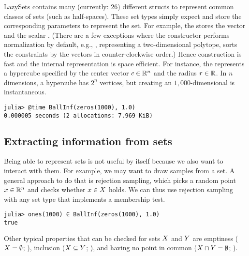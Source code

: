 \smallskip

LazySets contains many (currently: $26$) different structs to represent common classes of sets (such as half-spaces).
These set types simply expect and store the corresponding parameters to represent the set.
For example, the  stores the vector  and the scalar .
(There are a few exceptions where the constructor performs normalization by default, e.g., , representing a two-dimensional polytope, sorts the constraints by the vectors  in counter-clockwise order.)
Hence construction is fast and the internal representation is space efficient.
For instance, the  represents a hypercube specified by the center vector $c \in \mathbb{R}^n$ and the radius $r \in \mathbb{R}$.
In $n$ dimensions, a hypercube has $2^n$ vertices, but creating an $1{,}000$-dimensional  is instantaneous.

\begin{minipage}{\linewidth}
\begin{lstlisting}
julia> @time BallInf(zeros(1000), 1.0)
0.000005 seconds (2 allocations: 7.969 KiB)
\end{lstlisting}
\end{minipage}


\subsection{Extracting information from sets}

Being able to represent sets is not useful by itself because we also want to interact with them.
For example, we may want to draw samples from a set.
A general approach to do that is rejection sampling, which picks a random point $x \in \mathbb{R}^n$ and checks whether $x \in X$ holds.
We can thus use rejection sampling with any set type that implements a membership test.

\begin{minipage}{\linewidth}
\begin{lstlisting}
julia> ones(1000) ∈ BallInf(zeros(1000), 1.0)
true
\end{lstlisting}
\end{minipage}

Other typical properties that can be checked for sets $X$ and $Y$ are emptiness ($X = \emptyset$; ), inclusion ($X \subseteq Y$; ), and having no point in common ($X \cap Y = \emptyset$; ).

\smallskip

